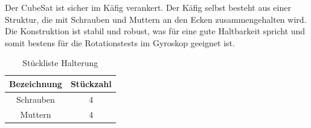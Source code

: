 \vspace{3mm}
Der CubeSat ist sicher im Käfig verankert. Der Käfig selbst besteht aus einer Struktur, die mit Schrauben und Muttern an den Ecken zusammengehalten wird. Die Konstruktion ist stabil und robust, was für eine gute Haltbarkeit spricht und somit bestens für die Rotationstests im Gyroskop geeignet ist. \\
\vspace{3mm}
\begin{table}[H]
    \centering
    \begin{tabular}{ | c | c | } 
  \hline
   \textbf{Bezeichnung} & \textbf{Stückzahl}\\ 
  \hline
   Schrauben  & 4\\ 
  \hline
  Muttern & 4 \\ 
  \hline
\end{tabular}
    \caption{Stückliste Halterung}
\end{table}